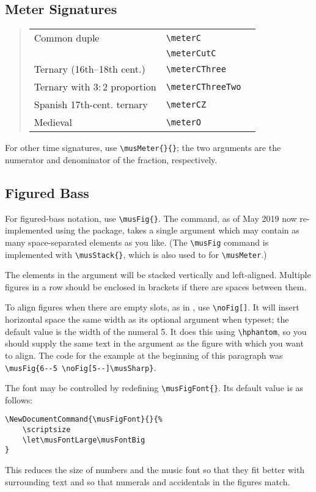 \documentclass{article}
\newenvironment{codetable}
{\begin{quote}\begin{tabular}{lll}}
{\end{tabular}\end{quote}}
\begin{document}
\subsection{Meter Signatures}

\begin{codetable}
    Common duple & \verb|\meterC| & \meterC\\
    \term{Alla breve} & \verb|\meterCutC| & \meterCutC\\
    Ternary (16th--18th cent.) & \verb|\meterCThree| & \meterCThree\\
    Ternary with $3:2$ proportion & \verb|\meterCThreeTwo| &
    \meterCThreeTwo\\
    Spanish 17th-cent. ternary & \verb|\meterCZ| & \meterCZ\\
    Medieval \term{tempus perfectum} & \verb|\meterO| & \meterO\\
\end{codetable}

For other time signatures, use \verb|\musMeter{}{}|; the two arguments are the
numerator and denominator of the fraction, respectively.

\subsection{Figured Bass}

For figured-bass notation, use \verb|\musFig{}|.
The command, as of May 2019 now re-implemented using the 
package, takes a single argument which may contain as many space-separated
elements as you like. 
(The \verb|\musFig| command is implemented with \verb|\musStack{}|, which is
also used to for \verb|\musMeter|.)

The elements in the argument will be stacked vertically and left-aligned.
Multiple figures in a row should be enclosed in brackets if there are spaces
between them.

To align figures when there are empty slots, as in , use \verb|\noFig[]|. 
It will insert horizontal space the
same width as its optional argument when typeset; the default value is the
width of the numeral 5.
It does this using \verb|\hphantom|, so you should supply the same text in the
argument as the figure with which you want to align. 
The code for the example at the beginning of this paragraph was 
\verb|\musFig{6--5 \noFig[5--]\musSharp}|.

The font may be controlled by redefining \verb|\musFigFont{}|.
Its default value is as follows:
\begin{Verbatim}
\NewDocumentCommand{\musFigFont}{}{%
    \scriptsize
    \let\musFontLarge\musFontBig
}
\end{Verbatim}
This reduces the size of numbers and the music font so that they fit better with
surrounding text and so that numerals and accidentals in the figures match.
\end{document}
